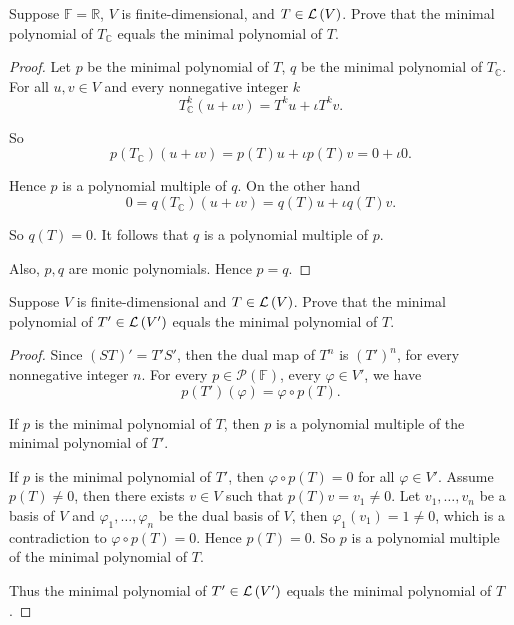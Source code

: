 \begin{exercise}
    Suppose $\mathbb{F} = \mathbb{R}$, $V$ is finite-dimensional, and $T\in\mathcal{L}\left({V}\right)$. Prove that the minimal polynomial of $T_{\mathbb{C}}$ equals the minimal polynomial of $T$.
\end{exercise}

\begin{proof}
    Let $p$ be the minimal polynomial of $T$, $q$ be the minimal polynomial of $T_{\mathbb{C}}$. For all $u, v\in V$ and every nonnegative integer $k$
    \[
        T_{\mathbb{C}}^{k}(u + \iota v) = T^{k}u + \iota T^{k}v.
    \]

    So
    \[
        p(T_{\mathbb{C}})(u + \iota v) = p(T)u + \iota p(T)v = 0 + \iota 0.
    \]

    Hence $p$ is a polynomial multiple of $q$. On the other hand
    \[
        0 = q(T_{\mathbb{C}})(u + \iota v) = q(T)u + \iota q(T)v.
    \]

    So $q(T) = 0$. It follows that $q$ is a polynomial multiple of $p$.

    Also, $p, q$ are monic polynomials. Hence $p = q$.
\end{proof}
\newpage

\begin{exercise}\label{chapter5:sectionB:exercise28}
    Suppose $V$ is finite-dimensional and $T \in \mathcal{L}\left({V}\right)$. Prove that the minimal polynomial of $T' \in \mathcal{L}\left({V'}\right)$ equals the minimal polynomial of $T$.
\end{exercise}

\begin{proof}
    Since $(ST)' = T'S'$, then the dual map of $T^{n}$ is ${(T')}^{n}$, for every nonnegative integer $n$. For every $p\in\mathscr{P}(\mathbb{F})$, every $\varphi\in V'$, we have
    \[
        p(T')(\varphi) = \varphi\circ p(T).
    \]

    If $p$ is the minimal polynomial of $T$, then $p$ is a polynomial multiple of the minimal polynomial of $T'$.

    If $p$ is the minimal polynomial of $T'$, then $\varphi\circ p(T) = 0$ for all $\varphi\in V'$. Assume $p(T)\ne 0$, then there exists $v\in V$ such that $p(T)v = v_{1}\ne 0$. Let $v_{1}, \ldots, v_{n}$ be a basis of $V$ and $\varphi_{1}, \ldots, \varphi_{n}$ be the dual basis of $V$, then $\varphi_{1}(v_{1}) = 1\ne 0$, which is a contradiction to $\varphi\circ p(T) = 0$. Hence $p(T) = 0$. So $p$ is a polynomial multiple of the minimal polynomial of $T$.

    Thus the minimal polynomial of $T' \in \mathcal{L}\left({V'}\right)$ equals the minimal polynomial of $T$.
\end{proof}
\newpage

